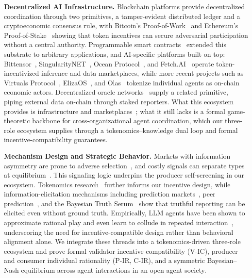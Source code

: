 \noindent\textbf{Decentralized AI Infrastructure.} Blockchain platforms provide decentralized coordination through two primitives, a tamper-evident distributed ledger and a cryptoeconomic consensus rule, with Bitcoin's Proof-of-Work~\cite{nakamoto2008bitcoin} and Ethereum's Proof-of-Stake~\cite{buterin2017casper} showing that token incentives can secure adversarial participation without a central authority. Programmable smart contracts~\cite{buterin2014ethereum} extended this substrate to arbitrary applications, and AI-specific platforms built on top: Bittensor~\cite{bittensor2023}, SingularityNET~\cite{goertzel2017singularitynet}, Ocean Protocol~\cite{ocean2019protocol}, and Fetch.AI~\cite{fetch2019ai} operate token-incentivized inference and data marketplaces, while more recent projects such as Virtuals Protocol~\cite{virtuals2024}, ElizaOS~\cite{walters2025eliza}, and Olas~\cite{olas2024valory} tokenize individual agents as on-chain economic actors. Decentralized oracle networks~\cite{breidenbach2021chainlink} supply a related primitive, piping external data on-chain through staked reporters. What this ecosystem provides is infrastructure and marketplaces~\cite{ding2024deai}; what it still lacks is a formal game-theoretic backbone for cross-organizational agent coordination, which our three-role ecosystem supplies through a tokenomics--knowledge dual loop and formal incentive-compatibility guarantees.

\noindent\textbf{Mechanism Design and Strategic Behavior.} Markets with information asymmetry are prone to adverse selection~\cite{akerlof1970market}, and costly signals can separate types at equilibrium~\cite{spence1973job}. This signaling logic underpins the producer self-screening in our ecosystem. Tokenomics research~\cite{ito2024cryptoeconomics, abadi2024governance, zuo2023set} further informs our incentive design, while information-elicitation mechanisms including prediction markets~\cite{wolfers2004prediction}, peer prediction~\cite{miller2005eliciting, dasgupta2013crowdsourced}, and the Bayesian Truth Serum~\cite{prelec2004bayesian} show that truthful reporting can be elicited even without ground truth. Empirically, LLM agents have been shown to approximate rational play and even learn to collude in repeated interaction~\cite{duetting2024mechanism, horton2023homo, brookins2023gpt_games, akata2023repeated_games, fish2024collusion, conitzer2024social_choice}, underscoring the need for incentive-compatible design rather than behavioral alignment alone. We integrate these threads into a tokenomics-driven three-role ecosystem and prove formal validator incentive compatibility (V-IC), producer and consumer individual rationality (P-IR, C-IR), and a symmetric Bayesian--Nash equilibrium across agent interactions in an open agent society.
